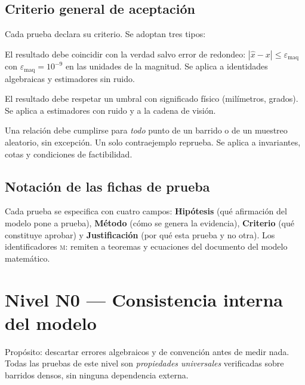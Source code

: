 \documentclass[11pt,a4paper]{article}
\begin{document}
\subsection{Criterio general de aceptación}

Cada prueba declara su criterio. Se adoptan tres tipos:

\begin{description}[leftmargin=2.4em,style=nextline,font=\normalfont\itshape]
\item[Exactitud numérica.] El resultado debe coincidir con la verdad salvo error de
  redondeo: $|\hat x - x| \le \varepsilon_{\mathrm{maq}}$ con
  $\varepsilon_{\mathrm{maq}} = 10^{-9}$ en las unidades de la magnitud. Se aplica a
  identidades algebraicas y estimadores sin ruido.
\item[Cota física.] El resultado debe respetar un umbral con significado físico
  (milímetros, grados). Se aplica a estimadores con ruido y a la cadena de visión.
\item[Propiedad universal.] Una relación debe cumplirse para \emph{todo} punto de un
  barrido o de un muestreo aleatorio, sin excepción. Un solo contraejemplo reprueba.
  Se aplica a invariantes, cotas y condiciones de factibilidad.
\end{description}

\subsection{Notación de las fichas de prueba}

Cada prueba se especifica con cuatro campos: \textbf{Hipótesis} (qué afirmación del
modelo pone a prueba), \textbf{Método} (cómo se genera la evidencia),
\textbf{Criterio} (qué constituye aprobar) y \textbf{Justificación} (por qué esta
prueba y no otra). Los identificadores \textsc{m}: remiten a teoremas y
ecuaciones del documento del modelo matemático.

\section{Nivel N0 --- Consistencia interna del modelo}

Propósito: descartar errores algebraicos y de convención antes de medir nada. Todas
las pruebas de este nivel son \emph{propiedades universales} verificadas sobre
barridos densos, sin ninguna dependencia externa.
\end{document}
